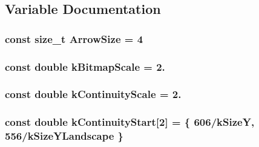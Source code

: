 \subsection{Variable Documentation}
\hypertarget{a00222_a72b217e4c4e685e122228438065866e7}{
\subsubsection[{Arrow\-Size}]{\setlength{\rightskip}{0pt plus 5cm}const size\-\_\-t Arrow\-Size = 4\hspace{0.3cm}{\ttfamily [static]}}}\label{a00222_a72b217e4c4e685e122228438065866e7}
\hypertarget{a00222_a7a3ea50920d637dcff6f9d4d2d9503d5}{
\subsubsection[{k\-Bitmap\-Scale}]{\setlength{\rightskip}{0pt plus 5cm}const double k\-Bitmap\-Scale = 2.\hspace{0.3cm}{\ttfamily [static]}}}\label{a00222_a7a3ea50920d637dcff6f9d4d2d9503d5}
\hypertarget{a00222_a66755ba8e00db497f31357a2dc71075a}{
\subsubsection[{k\-Continuity\-Scale}]{\setlength{\rightskip}{0pt plus 5cm}const double k\-Continuity\-Scale = 2.\hspace{0.3cm}{\ttfamily [static]}}}\label{a00222_a66755ba8e00db497f31357a2dc71075a}
\hypertarget{a00222_a22335fbdd42d9304c5d7691424e4d22b}{
\subsubsection[{k\-Continuity\-Start}]{\setlength{\rightskip}{0pt plus 5cm}const double k\-Continuity\-Start\mbox{[}2\mbox{]} = \{ 606/{\bf k\-Size\-Y}, 556/{\bf k\-Size\-Y\-Landscape} \}\hspace{0.3cm}{\ttfamily [static]}}}\label{a00222_a22335fbdd42d9304c5d7691424e4d22b}
